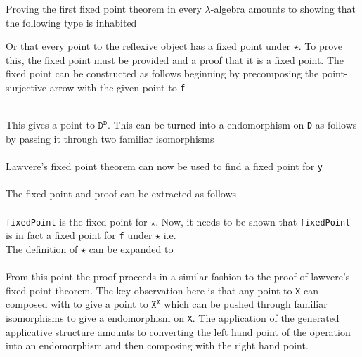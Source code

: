 
Proving the first fixed point theorem in every $\lambda$-algebra amounts to
showing that the following type is inhabited

Or that every point to the reflexive object has a fixed point under $\star$. To
prove this, the fixed point must be provided and a proof that it is a fixed
point. The fixed point can be constructed as follows beginning by precomposing the
point-surjective arrow with the given point to \verb|f|

\begin{AgdaMultiCode}
\\
This gives a point to $\texttt{D}^\texttt{D}$. This can be turned into a
endomorphism on \verb|D| as follows by passing it through two familiar
isomorphisms
\\
\\
Lawvere's fixed point theorem can now be used to find a fixed point for
\verb|y|
\\
\\
The fixed point and proof can be extracted as follows
\\
\\
\verb|fixedPoint| is the fixed point for $\star$. Now, it needs to be shown that
\verb|fixedPoint| is in fact a fixed point for \verb|f| under $\star$ i.e.
\\
The definition of $\star$ can be expanded to
\\
\\
From this point the proof proceeds in a similar fashion to the proof of
lawvere's fixed point theorem. The key observation here is that any point to
\verb|X| can composed with  to give a point to
$\texttt{X}^{\texttt{X}}$ which can be pushed through familiar isomorphisms to
give a endomorphism on \verb|X|. The application of the generated applicative
structure amounts to converting the left hand point of the operation into an
endomorphism and then composing with the right hand point.

\end{AgdaMultiCode}
